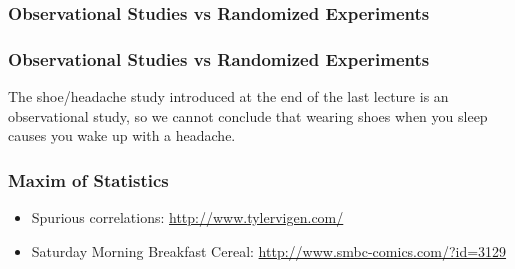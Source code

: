 \documentclass[handout]{beamer}
\newcommand{\blue}[1]{\textcolor{blue2}{#1}}
\begin{document}
\begin{frame}
\frametitle{Observational Studies vs Randomized Experiments}

%
%
%

\end{frame}


\begin{frame}
\frametitle{Observational Studies vs Randomized Experiments}

The shoe/headache study introduced at the end of the last lecture is an \blue{observational study}, so we cannot conclude that wearing shoes when you sleep causes you wake up with a headache.

\end{frame}


\begin{frame}
\frametitle{Maxim of Statistics}

%
%

\pause \begin{itemize}
\item Spurious correlations:  \blue{\href{http://www.tylervigen.com/spurious-correlations}{http://www.tylervigen.com/}}
\item Saturday Morning Breakfast Cereal:  \blue{\href{http://www.smbc-comics.com/?id=3129}{http://www.smbc-comics.com/?id=3129}}
\end{itemize}



\end{frame}
\end{document}
